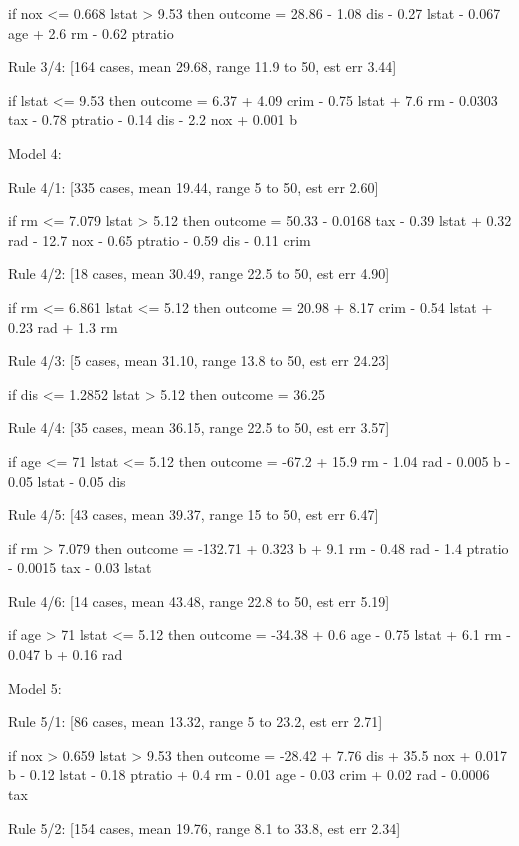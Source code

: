 \documentclass[12pt]{article}
\renewenvironment{Schunk}{\vspace{\topsep}}{\vspace{\topsep}}
\begin{document}
\begin{Schunk}
\begin{Soutput}
    if
	nox <= 0.668
	lstat > 9.53
    then
	outcome = 28.86 - 1.08 dis - 0.27 lstat - 0.067 age + 2.6 rm
	          - 0.62 ptratio

  Rule 3/4: [164 cases, mean 29.68, range 11.9 to 50, est err 3.44]

    if
	lstat <= 9.53
    then
	outcome = 6.37 + 4.09 crim - 0.75 lstat + 7.6 rm - 0.0303 tax
	          - 0.78 ptratio - 0.14 dis - 2.2 nox + 0.001 b

Model 4:

  Rule 4/1: [335 cases, mean 19.44, range 5 to 50, est err 2.60]

    if
	rm <= 7.079
	lstat > 5.12
    then
	outcome = 50.33 - 0.0168 tax - 0.39 lstat + 0.32 rad - 12.7 nox
	          - 0.65 ptratio - 0.59 dis - 0.11 crim

  Rule 4/2: [18 cases, mean 30.49, range 22.5 to 50, est err 4.90]

    if
	rm <= 6.861
	lstat <= 5.12
    then
	outcome = 20.98 + 8.17 crim - 0.54 lstat + 0.23 rad + 1.3 rm

  Rule 4/3: [5 cases, mean 31.10, range 13.8 to 50, est err 24.23]

    if
	dis <= 1.2852
	lstat > 5.12
    then
	outcome = 36.25

  Rule 4/4: [35 cases, mean 36.15, range 22.5 to 50, est err 3.57]

    if
	age <= 71
	lstat <= 5.12
    then
	outcome = -67.2 + 15.9 rm - 1.04 rad - 0.005 b - 0.05 lstat - 0.05 dis

  Rule 4/5: [43 cases, mean 39.37, range 15 to 50, est err 6.47]

    if
	rm > 7.079
    then
	outcome = -132.71 + 0.323 b + 9.1 rm - 0.48 rad - 1.4 ptratio
	          - 0.0015 tax - 0.03 lstat

  Rule 4/6: [14 cases, mean 43.48, range 22.8 to 50, est err 5.19]

    if
	age > 71
	lstat <= 5.12
    then
	outcome = -34.38 + 0.6 age - 0.75 lstat + 6.1 rm - 0.047 b + 0.16 rad

Model 5:

  Rule 5/1: [86 cases, mean 13.32, range 5 to 23.2, est err 2.71]

    if
	nox > 0.659
	lstat > 9.53
    then
	outcome = -28.42 + 7.76 dis + 35.5 nox + 0.017 b - 0.12 lstat
	          - 0.18 ptratio + 0.4 rm - 0.01 age - 0.03 crim + 0.02 rad
	          - 0.0006 tax

  Rule 5/2: [154 cases, mean 19.76, range 8.1 to 33.8, est err 2.34]


\end{Soutput}
\end{Schunk}
\end{document}
